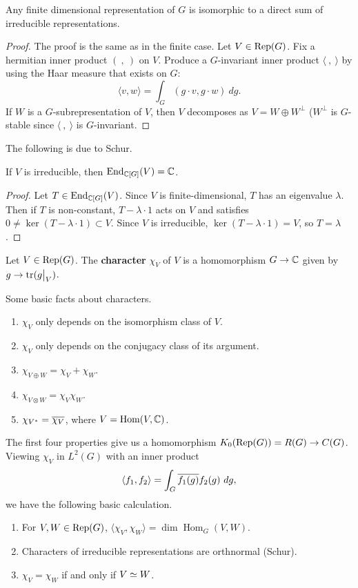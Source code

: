 \begin{prop}
Any finite dimensional representation of $G$ is isomorphic to a direct sum of
irreducible representations.
\end{prop}

\begin{proof}
The proof is the same as in the finite case. Let $V \in \mathrm{Rep}(G)$. Fix a 
hermitian inner product $( \ , \ )$ on $V$. Produce a $G$-invariant inner product $\langle \ , \ \rangle$ by using the Haar measure that exists on $G$:
\[ \langle v, w \rangle = \int_G (g \cdot v, g \cdot w) \ dg. \]
If $W$ is a $G$-subrepresentation of $V$, then $V$ decomposes as
$V = W \oplus W^\perp$ ($W^\perp$ is $G$-stable since $\langle \ , \ \rangle$ is
$G$-invariant.
\end{proof}

The following is due to Schur.

\begin{cor}
If $V$ is irreducible, then $\operatorname{End}_{\mathbb{C}[G]}(V) = \mathbb{C}$.
\end{cor}

\begin{proof}
Let $T \in \operatorname{End}_{\mathbb{C}[G]}(V)$. Since $V$ is finite-dimensional, $T$ has an
eigenvalue $\lambda$. Then if $T$ is non-constant, $T - \lambda \cdot 1$ acts 
on $V$ and satisfies $0 \neq \ker(T - \lambda \cdot 1) \subset V$. Since $V$ is
irreducible, $\ker(T -\lambda \cdot 1) = V$, so $T = \lambda$.
\end{proof}

\begin{defn}
Let $V \in \mathrm{Rep}(G)$. The \textbf{character} $\chi_V$ of $V$ is a homomorphism
$G \rightarrow \mathbb{C}$ given by $g \rightarrow \tr(\restr{g}{V})$.
\end{defn}

Some basic facts about characters.

\begin{enumerate}[1.]
\item $\chi_V$ only depends on the isomorphism class of $V$.
\item $\chi_V$ only depends on the conjugacy class of its argument.
\item $\chi_{V \oplus W} = \chi_V + \chi_W$.
\item $\chi_{V \otimes W} = \chi_V \chi_W$.
\item $\chi_{V^*} = \overline{\chi_V}$, where $V = \operatorname{Hom}(V, \mathbb{C})$.
\end{enumerate}

The first four properties give us a homomorphism
$K_0(\mathrm{Rep}(G)) = R(G) \rightarrow C(G)$. Viewing $\chi_V$ in $L^2(G)$ with an
inner product
\[ \langle f_1, f_2 \rangle = \int_G \overline{f_1(g)} f_2(g) \ dg, \]
we have the following basic calculation.

\begin{prop}
\begin{enumerate}[(1)]
\item For $V, W \in \mathrm{Rep}(G)$,
$\langle \chi_V, \chi_W \rangle = \dim \operatorname{Hom}_G (V, W).$
\item Characters of irreducible representations are orthnormal (Schur).
\item $\chi_V = \chi_W$ if and only if $V \simeq W$.
\end{enumerate}
\end{prop}
